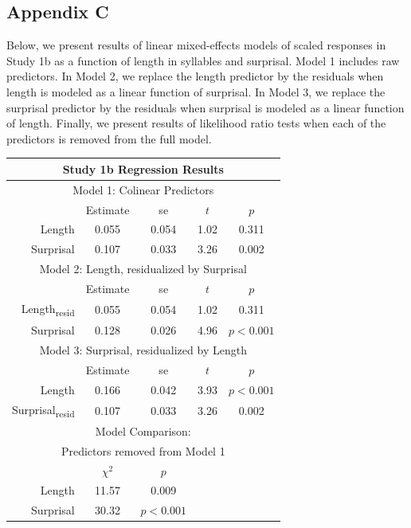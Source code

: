 \subsection{Appendix C}

Below, we present results of linear mixed-effects models of scaled responses in Study 1b as a function of length in syllables and surprisal.
Model 1 includes raw predictors.
In Model 2, we replace the length predictor by the residuals when length is modeled as a linear function of surprisal.
In Model 3, we replace the surprisal predictor by the residuals when surprisal is modeled as a linear function of length.
Finally, we present results of likelihood ratio tests when each of the predictors is removed from the full model.

\vspace{4mm}

\noindent
\footnotesize{
\begin{tabular}{r|cccc}
\hline
\hline
\multicolumn{5}{c}{\textbf{Study 1b Regression Results}} \\
\hline
\hline
\multicolumn{5}{c}{Model 1: Colinear Predictors} \\
& Estimate & se & $t$ & $p$ \\
\hline
Length & 0.055 & 0.054 & 1.02 & 0.311 \\
Surprisal & 0.107 & 0.033 & 3.26 & 0.002 \\
\hline
\hline
\multicolumn{5}{c}{Model 2: Length, residualized by Surprisal} \\
& Estimate & se & $t$ & $p$ \\
\hline
Length\textsubscript{resid} & 0.055 & 0.054 & 1.02 & 0.311 \\
Surprisal & 0.128 & 0.026 & 4.96 & $p<0.001$ \\
\hline
\hline
\multicolumn{5}{c}{Model 3: Surprisal, residualized by Length} \\
& Estimate & se & $t$ & $p$ \\
\hline
Length & 0.166 & 0.042 & 3.93 & $p<0.001$ \\
Surprisal\textsubscript{resid} & 0.107 & 0.033 & 3.26 & 0.002 \\
\hline
\hline
\multicolumn{5}{c}{Model Comparison:} \\
\multicolumn{5}{c}{Predictors removed from Model 1} \\
& $\chi^2$ & $p$ \\
\hline
Length & 11.57 & 0.009 \\
Surprisal & 30.32 & $p<0.001$ \\
\hline
\hline
\end{tabular}
}



